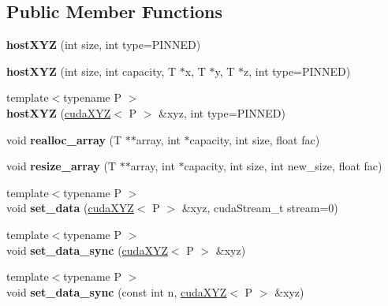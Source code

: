 \subsection*{Public Member Functions}
\begin{DoxyCompactItemize}
\item 
\hypertarget{classhostXYZ_aa778fc828bc0c9663e3ba1e594029909}{}\label{classhostXYZ_aa778fc828bc0c9663e3ba1e594029909} 
{\bfseries host\+X\+YZ} (int size, int type=P\+I\+N\+N\+ED)
\item 
\hypertarget{classhostXYZ_a06d4785f9d8f460fcb7d695c62523638}{}\label{classhostXYZ_a06d4785f9d8f460fcb7d695c62523638} 
{\bfseries host\+X\+YZ} (int size, int capacity, T $\ast$x, T $\ast$y, T $\ast$z, int type=P\+I\+N\+N\+ED)
\item 
\hypertarget{classhostXYZ_a77c082148d16bd13d33814c44b698e4c}{}\label{classhostXYZ_a77c082148d16bd13d33814c44b698e4c} 
{\footnotesize template$<$typename P $>$ }\\{\bfseries host\+X\+YZ} (\hyperlink{classcudaXYZ}{cuda\+X\+YZ}$<$ P $>$ \&xyz, int type=P\+I\+N\+N\+ED)
\item 
\hypertarget{classhostXYZ_aa5af59ff12ad0a63441b21a287a84875}{}\label{classhostXYZ_aa5af59ff12ad0a63441b21a287a84875} 
void {\bfseries realloc\+\_\+array} (T $\ast$$\ast$array, int $\ast$capacity, int size, float fac)
\item 
\hypertarget{classhostXYZ_a89f504dfcafda1ea2abccb888227f2db}{}\label{classhostXYZ_a89f504dfcafda1ea2abccb888227f2db} 
void {\bfseries resize\+\_\+array} (T $\ast$$\ast$array, int $\ast$capacity, int size, int new\+\_\+size, float fac)
\item 
\hypertarget{classhostXYZ_af5974c831a3548b39df8528fb4c65e6f}{}\label{classhostXYZ_af5974c831a3548b39df8528fb4c65e6f} 
{\footnotesize template$<$typename P $>$ }\\void {\bfseries set\+\_\+data} (\hyperlink{classcudaXYZ}{cuda\+X\+YZ}$<$ P $>$ \&xyz, cuda\+Stream\+\_\+t stream=0)
\item 
\hypertarget{classhostXYZ_ad0d6cd06fc015dd552a6aae5c520ea73}{}\label{classhostXYZ_ad0d6cd06fc015dd552a6aae5c520ea73} 
{\footnotesize template$<$typename P $>$ }\\void {\bfseries set\+\_\+data\+\_\+sync} (\hyperlink{classcudaXYZ}{cuda\+X\+YZ}$<$ P $>$ \&xyz)
\item 
\hypertarget{classhostXYZ_a27bbb0044ea8c704e872be2b6ea8af6b}{}\label{classhostXYZ_a27bbb0044ea8c704e872be2b6ea8af6b} 
{\footnotesize template$<$typename P $>$ }\\void {\bfseries set\+\_\+data\+\_\+sync} (const int n, \hyperlink{classcudaXYZ}{cuda\+X\+YZ}$<$ P $>$ \&xyz)

\end{DoxyCompactItemize}
